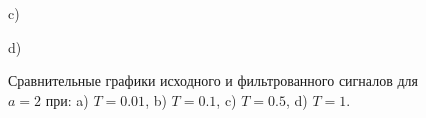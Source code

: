 \documentclass[a5paper, 10pt]{article}
\theoremstyle{definition}
\theoremstyle{plain}
\theoremstyle{remark}
\begin{document}
\begin{figure}[h!]
\begin{minipage}[h!]{0.47\linewidth}
 c) \\
\end{minipage}
\hfill
\begin{minipage}[h!]{0.47\linewidth}
 d) \\
\end{minipage}
\caption{Сравнительные графики исходного и фильтрованного сигналов для $a=2$ при: a) $T=0.01$, b)
$T=0.1$, c) $T=0.5$, d) $T=1$.}
\end{figure}




\,
\\\\\\
\\
\\
\\
\\
\\
\\
\\
\\
\\
\\
\\
\\
\\
\end{document}
